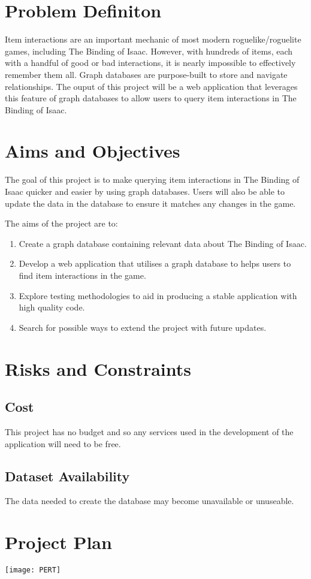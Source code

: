 \section{Problem Definiton}
Item interactions are an important mechanic of most modern roguelike/roguelite games, including The Binding of Isaac. 
However, with hundreds of items, each with a handful of good or bad interactions, it is nearly impossible to effectively
 remember them all. Graph databases are purpose-built to store and navigate relationships.\cite{WhatGraphDatabase} 
The ouput of this project will be a web application that leverages this feature of graph databases to allow users to query item 
interactions in The Binding of Isaac.
\section{Aims and Objectives}
The goal of this project is to make querying item interactions in The Binding of Isaac quicker and easier by using graph
 databases. Users will also be able to update the data in the database to ensure it matches any changes in the game.\par
The aims of the project are to:
\begin{enumerate}
    \item Create a graph database containing relevant data about The Binding of Isaac.
    \item Develop a web application that utilises a graph database to helps users to find item interactions in the game.
    \item Explore testing methodologies to aid in producing a stable application with high quality code.
    \item Search for possible ways to extend the project with future updates.
\end{enumerate}
\section{Risks and Constraints}
\subsection*{Cost}
This project has no budget and so any services used in the development of the application will need to be free.
\subsection*{Dataset Availability}
The data needed to create the database may become unavailable or unuseable.
\section{Project Plan}
\texttt{[image: PERT]}